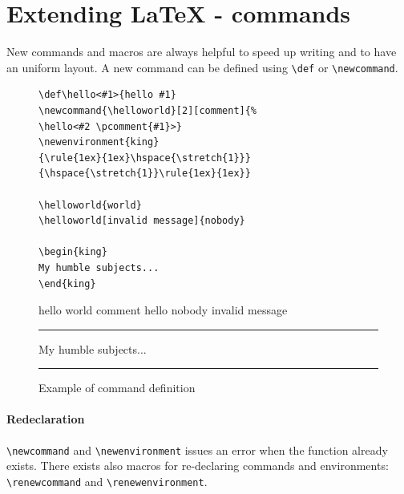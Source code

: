 \section{Extending \LaTeX{} - commands}

New commands and macros are always helpful to speed up writing and to have an
uniform layout.
A new command can be defined using \lstinline$\def$ or \lstinline$\newcommand$.

\begin{figure}[H]
\centering
\begin{minipage}{0.5\linewidth}
\begin{lstlisting}[basicstyle=\scriptsize\ttfamily]
\def\hello<#1>{hello #1}
\newcommand{\helloworld}[2][comment]{%
\hello<#2 \pcomment{#1}>}
\newenvironment{king}
{\rule{1ex}{1ex}\hspace{\stretch{1}}}
{\hspace{\stretch{1}}\rule{1ex}{1ex}}

\helloworld{world}
\helloworld[invalid message]{nobody}

\begin{king}
My humble subjects...
\end{king}
\end{lstlisting}
\end{minipage}
\begin{minipage}{0.4\linewidth}
\def\hello<#1>{hello #1}
\newcommand{\helloworld}[2][comment]{%
\hello<#2 \pcomment{#1}>}
\newenvironment{king}
{\rule{1ex}{1ex}\hspace{\stretch{1}}}
{\hspace{\stretch{1}}\rule{1ex}{1ex}}

\helloworld{world}
\helloworld[invalid message]{nobody}

\begin{king}
My humble subjects...
\end{king}
\end{minipage}
\caption{Example of command definition}
\end{figure}

\paragraph{Redeclaration}
\lstinline$\newcommand$ and \lstinline$\newenvironment$ issues an error when the
function already exists.
There exists also macros for re-declaring commands and environments:
\lstinline$\renewcommand$ and \lstinline$\renewenvironment$.

